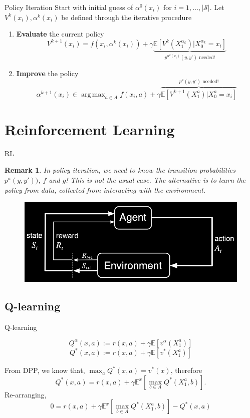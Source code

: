 \documentclass[usenames,handout,aspectratio=169]{beamer}
\newtheorem{remark}{Remark}[theorem]
\DeclareMathOperator*{\argmax}{arg\,max}
\begin{document}
\begin{frame}{Policy Iteration}
Start with initial guess of $\alpha^0(x_i)$ for $i=1,\ldots,|\mathcal S|$. Let $V^k(x_i), \alpha^k(x_i)$ be defined through the iterative procedure
	\begin{enumerate}
	\item \textbf{Evaluate} the current policy
\[
V^{k+1}(x_i) = f(x_i, \alpha^k(x_i)) + \gamma \underbrace{\mathbb E\left[V^k(X_1^{\alpha_k})|X_0^{\alpha_k}=x_i\right]}_{p^{\alpha^k(x_i)}(y,y') \text{ needed}!}
\]
	\item \textbf{Improve} the policy
\[\alpha^{k+1}(x_i) \in \argmax_{a\in A} f(x_i, a) + \gamma \overbrace{\mathbb E\left[V^{k+1}(X_1^{a})|X_0^{a}=x_i\right]}^{p^{a}(y,y') \text{ needed}!} \]
	\end{enumerate}

\end{frame}

\section{Reinforcement Learning}
\begin{frame}{RL}
\begin{remark}
	In policy iteration, we need to know the transition probabilities $p^a(y,y'))$, $f$ and $g$! This is not the usual case. The alternative is to learn the policy from data, collected from interacting with the environment. 
\end{remark}
\begin{figure}[h]
\includegraphics[width=0.65\linewidth]{images/RL_inv.png}
\end{figure}
\end{frame}

\subsection{Q-learning}
\begin{frame}{Q-learning}
\begin{Definition}[Q-function]
	\[
	Q^\alpha(x,a) := r(x,a) + \gamma \mathbb E [v^\alpha(X_1^a)]
	\]
	\[
	Q^*(x,a) := r(x,a) + \gamma \mathbb E [v^*(X_1^a)]
	\]
\end{Definition}



From DPP, we know that, $\max_a Q^*(x,a) = v^*(x)$, therefore
\[
Q^*(x,a) = r(x,a) + \gamma \mathbb E^x [\max_{b\in A}Q^*(X^a_1,b)].
\]
Re-arranging, 
\[
0 = r(x,a) + \gamma \mathbb E^x [\max_{b\in A}Q^*(X^a_1,b)] - Q^*(x,a)
\]
\end{frame}
\end{document}
